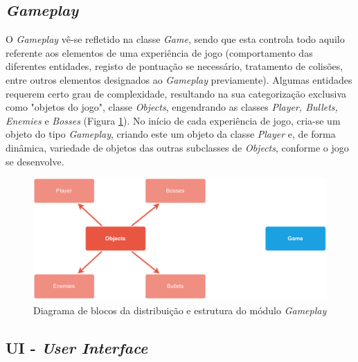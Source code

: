 \documentclass[a4paper,11pt]{article}
\begin{document}
\vspace{8pt}

\subsection*{\textit{Gameplay}}

\vspace{8pt}

O \textit{Gameplay} vê-se refletido na classe \textit{Game}, sendo que esta controla todo aquilo referente aos elementos de uma experiência de jogo (comportamento das diferentes entidades, registo de pontuação se necessário, tratamento de colisões, entre outros elementos designados ao \textit{Gameplay} previamente). Algumas entidades requerem certo grau de complexidade, resultando na sua categorização exclusiva como "objetos do jogo", classe \textit{Objects}, engendrando as classes \textit{Player, Bullets, Enemies} e \textit{Bosses} (Figura \ref{fig:ClassGameplay}). No início de cada experiência de jogo, cria-se um objeto do tipo \textit{Gameplay}, criando este um objeto da classe \textit{Player} e, de forma dinâmica, variedade de objetos das outras subclasses de \textit{Objects}, conforme o jogo se desenvolve.

\vspace{8pt}

\begin{figure}[!ht]
    \centering
    \includegraphics[scale = 0.60]{2 - Esquemas/ClassGameplay.pdf}
    \caption{Diagrama de blocos da distribuição e estrutura do módulo \textit{Gameplay}}
    \label{fig:ClassGameplay}
\end{figure}

\vspace{8pt}

\subsection*{UI - \textit{User Interface}}
\end{document}

